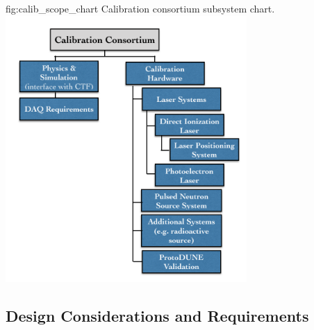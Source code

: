 

\begin{dunefigure}{fig:calib_scope_chart}
{Calibration consortium subsystem chart.}
\includegraphics[height=4.0in]{graphics/calib_scope_chart.png}
\end{dunefigure}


%


\subsection{Design Considerations and Requirements}
\label{sec:sp-calib-ov-consid}

